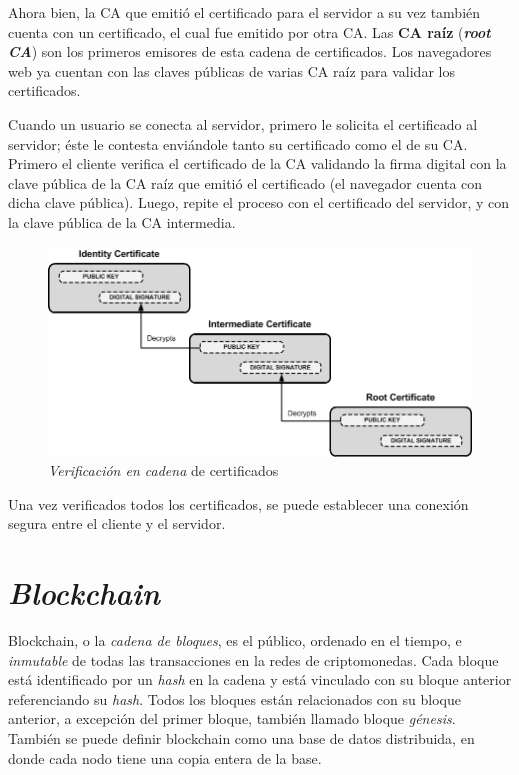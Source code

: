 Ahora bien, la CA que emitió el certificado para el servidor a su vez también cuenta con un certificado, el cual fue emitido por otra CA. Las \textbf{CA raíz} (\textbf{\emph{root CA}}) son los primeros emisores de esta cadena de certificados. Los navegadores web ya cuentan con las claves públicas de varias CA raíz para validar los certificados. 

Cuando un usuario se conecta al servidor, primero le solicita el certificado al servidor; éste le contesta enviándole tanto su certificado como el de su CA. Primero el cliente verifica el certificado de la CA validando la firma digital con la clave pública de la CA raíz que emitió el certificado (el navegador cuenta con dicha clave pública). Luego, repite el proceso con el certificado del servidor, y con la clave pública de la CA intermedia.

\begin{figure}[H]
    \centering
    \includegraphics[width=0.8\linewidth]{images/pki-chain-of-trust.png}
    \caption*{\emph{Verificación en cadena} de certificados \autocite{FirenetPKIChainOfTrust}}
\end{figure}

Una vez verificados todos los certificados, se puede establecer una conexión segura entre el cliente y el servidor.

\section{\emph{Blockchain}}

Blockchain, o la \emph{cadena de bloques}, es el  público, ordenado en el tiempo, e \emph{inmutable} de todas las transacciones en la redes de criptomonedas. Cada bloque está identificado por un \emph{hash} en la cadena y está vinculado con su bloque anterior referenciando su \emph{hash}. Todos los bloques están relacionados con su bloque anterior, a excepción del primer bloque, también llamado bloque \emph{génesis}. También se puede definir blockchain como una base de datos distribuida, en donde cada nodo tiene una copia entera de la base.

